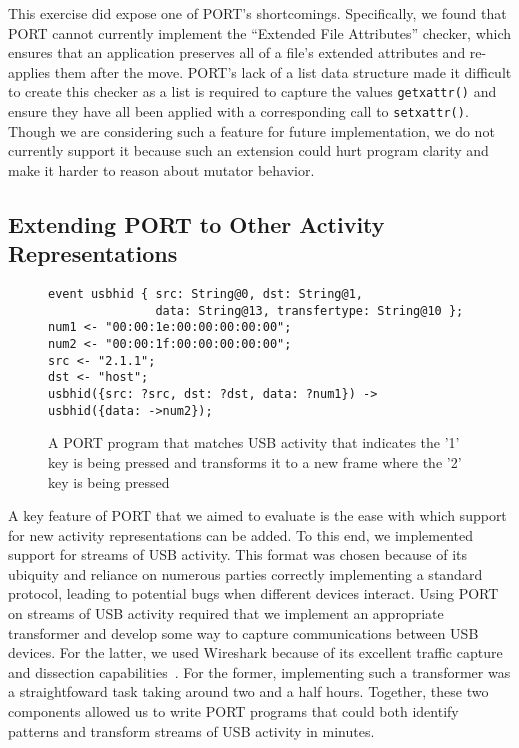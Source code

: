This exercise did expose one of PORT's shortcomings.  Specifically,
we found that PORT cannot currently implement the ``Extended File
Attributes'' checker, which
 ensures that an application
preserves all of a file's extended attributes and re-applies them after the move.
PORT's lack of a list data structure made it difficult to create this checker as a
list is required to capture the values {\tt getxattr()}
and ensure they have all been applied with a
corresponding call to {\tt setxattr()}.
Though we are considering such a feature for future implementation,
we do not currently support it because such an extension could
hurt program clarity and make it harder to reason about
mutator behavior.


\subsection{Extending PORT to Other Activity Representations}
\begin{figure}
  \begin{lstlisting}[basicstyle=\ttfamily\small,xleftmargin=.8em]
event usbhid { src: String@0, dst: String@1,
               data: String@13, transfertype: String@10 };
num1 <- "00:00:1e:00:00:00:00:00";
num2 <- "00:00:1f:00:00:00:00:00";
src <- "2.1.1";
dst <- "host";
usbhid({src: ?src, dst: ?dst, data: ?num1}) -> usbhid({data: ->num2});
  \end{lstlisting}
  \caption{A PORT program that matches USB activity that indicates the '1' key is being pressed and transforms it to a new frame where the '2' key is being pressed}
  \label{fig:USB}
\end{figure}


A key feature of PORT that we aimed to evaluate is the ease with which support for new activity representations 
can be added. To this end,
we implemented support for streams of USB activity. This format was chosen because of its ubiquity and reliance on numerous parties correctly implementing a standard protocol, leading to potential bugs when different devices interact.
Using PORT on streams of USB activity required that we implement an appropriate transformer and develop some way to capture communications between USB devices.
For the latter, we used Wireshark because of its excellent traffic capture and dissection capabilities~\cite{wireshark}.
For the former, implementing such a transformer was a straightfoward task taking around two and a half hours.
Together, these two components allowed us to write PORT programs that could both identify patterns and transform streams of USB activity in minutes.

